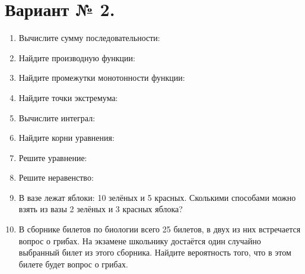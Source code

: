 \documentclass{article}
\begin{document}
\section*{Вариант № 2.}
\begin{enumerate}

  \item %
  Вычислите сумму последовательности:

  \item %
  Найдите производную функции:

  \item %
  Найдите промежутки монотонности функции:

  \item %
  Найдите точки экстремума:

  \item %
  Вычислите интеграл:

  \item %
  Найдите корни уравнения:

  \item %
  Решите уравнение:

  \item %
  Решите неравенство:

  \item %
  В вазе лежат яблоки: 10 зелёных и 5 красных. Сколькими способами можно взять из вазы 2 зелёных и 3 красных яблока?

  \item %
  В сборнике билетов по биологии всего 25 билетов, в двух из них встречается вопрос о грибах. На экзамене школьнику достаётся один случайно выбранный билет из этого сборника. Найдите вероятность того, что в этом билете будет вопрос о грибах.

\end{enumerate}
\end{document}
